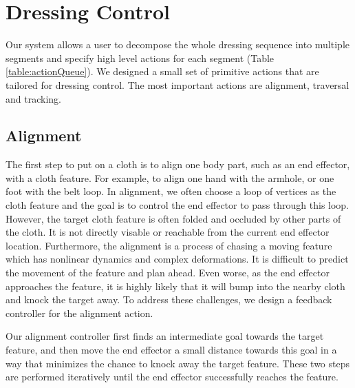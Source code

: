 \section{Dressing Control}

Our system allows a user to decompose the whole dressing sequence into multiple segments and specify high level actions for each segment (Table \ref{table:actionQueue}). We designed a small set of primitive actions that are tailored for dressing control. The most important actions are alignment, traversal and tracking.

\subsection{Alignment}


The first step to put on a cloth is to align one body part, such as an end effector, with a cloth feature. For example, to align one hand with the armhole, or one foot with the belt loop. In alignment, we often choose a loop of vertices as the cloth feature and the goal is to control the end effector to pass through this loop. However, the target cloth feature is often folded and occluded by other parts of the cloth. It is not directly visable or reachable from the current end effector location. Furthermore, the alignment is a process of chasing a moving feature which has nonlinear dynamics and complex deformations. It is difficult to predict the movement of the feature and plan ahead. Even worse, as the end effector approaches the feature, it is highly likely that it will bump into the nearby cloth and knock the target away.  To address these challenges, we design a feedback controller for the alignment action.

Our alignment controller first finds an intermediate goal towards the target feature, and then move the end effector a small distance towards this goal in a way that minimizes the chance to knock away the target feature. These two steps are performed iteratively until the end effector successfully reaches the feature. 

